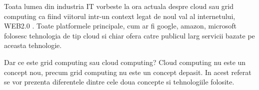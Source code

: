Toata lumea din industria IT vorbeste la ora actuala despre cloud sau grid computing ca fiind
viitorul intr-un context legat de noul val al internetului, WEB2.0 \cite{alexander2006web}. Toate
platformele principale, cum ar fi google, amazon, microsoft folosesc tehnologia de tip cloud si
chiar ofera catre publicul larg servicii bazate pe aceasta tehnologie.

Dar ce este grid computing sau cloud computing? Cloud computing nu este un concept nou, precum grid
computing nu este un concept depasit. In acest referat se vor prezenta diferentele dintre
cele doua concepte si tehnologiile folosite.

